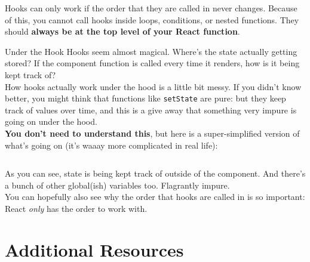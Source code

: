 Hooks can only work if the order that they are called in never changes. Because of this, you cannot call hooks inside loops, conditions, or nested functions. They should \textbf{always be at the top level of your React function}.

\begin{infobox}{Under the Hook}
    Hooks seem almost magical. Where's the state actually getting stored? If the component function is called every time it renders, how is it being kept track of?
    \\

    How hooks actually work under the hood is a little bit messy. If you didn't know better, you might think that functions like \texttt{setState} are pure: but they keep track of values over time, and this is a give away that something very impure is going on under the hood.
    \\

    \textbf{You don't need to understand this}, but here is a super-simplified version of what's going on (it's waaay more complicated in real life):

    \inputminted{js}{05-hooks/figures/15-under-the-hood.js}

    As you can see, state is being kept track of outside of the component. And there's a bunch of other global(ish) variables too. Flagrantly impure.
    \\

    You can hopefully also see why the order that hooks are called in is so important: React \textit{only} has the order to work with.
\end{infobox}


\section{Additional Resources}

